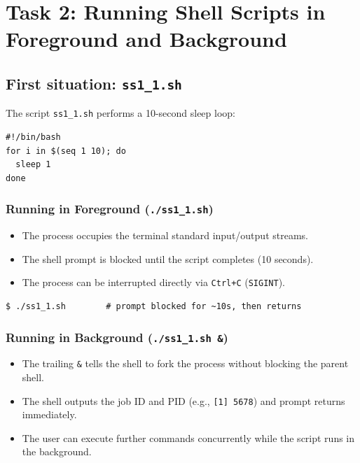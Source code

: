 \documentclass[11pt,a4paper]{article}
\begin{document}
\section{Task 2: Running Shell Scripts in Foreground and Background}

\subsection{First situation: \texttt{ss1\_1.sh}}

The script \texttt{ss1\_1.sh} performs a 10-second sleep loop:

\begin{lstlisting}[style=bashstyle]
#!/bin/bash
for i in $(seq 1 10); do
  sleep 1
done
\end{lstlisting}

\subsubsection*{Running in Foreground (\texttt{./ss1\_1.sh})}
\begin{itemize}[leftmargin=1.5em]
    \item The process occupies the terminal standard input/output streams.
    \item The shell prompt is blocked until the script completes (10 seconds).
    \item The process can be interrupted directly via \texttt{Ctrl+C} (\texttt{SIGINT}).
\end{itemize}

\begin{lstlisting}[style=termstyle]
$ ./ss1_1.sh        # prompt blocked for ~10s, then returns
\end{lstlisting}

\subsubsection*{Running in Background (\texttt{./ss1\_1.sh \&})}
\begin{itemize}[leftmargin=1.5em]
    \item The trailing \texttt{\&} tells the shell to fork the process without blocking the parent shell.
    \item The shell outputs the job ID and PID (e.g., \texttt{[1] 5678}) and prompt returns immediately.
    \item The user can execute further commands concurrently while the script runs in the background.
\end{itemize}
\end{document}
